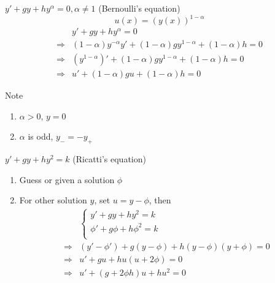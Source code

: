 \documentclass{beamer}
\begin{document}
\begin{frame}
\begin{block}{$y'+gy+hy^{\alpha}=0,\alpha\neq1$ (Bernoulli's equation)}
$$u(x)=(y(x))^{1-\alpha}$$
\begin{align*}
&y'+gy+hy^\alpha=0\\
\Rightarrow& (1-\alpha)y^{-\alpha}y'+(1-\alpha)gy^{1-\alpha}+(1-\alpha)h=0\\
\Rightarrow& (y^{1-\alpha})'+(1-\alpha)gy^{1-\alpha}+(1-\alpha)h=0\\
\Rightarrow& u'+(1-\alpha)gu+(1-\alpha)h=0
\end{align*}
\begin{block}{Note}
\begin{enumerate}
\item $\alpha>0$, $y=0$
\item $\alpha$ is odd, $y_-=-y_+$
\end{enumerate}
\end{block}
\end{block}
\end{frame}

\begin{frame}
\begin{block}{$y'+gy+hy^2=k$ (Ricatti's equation)}
\begin{enumerate}
\item Guess or given a solution $\phi$
\item For other solution $y$, set $u=y-\phi$, then
\begin{align*}
&\left\{
\begin{aligned}
y'+gy+hy^2=k\\
\phi'+g\phi+h\phi^2=k\\
\end{aligned}
\right.\\\Rightarrow & (y'-\phi')+g(y-\phi)+h(y-\phi)(y+\phi)=0\\
\Rightarrow&u'+gu+hu(u+2\phi)=0\\
\Rightarrow&u'+(g+2\phi h)u+hu^2=0
\end{align*}
\end{enumerate}
\end{block}
\end{frame}
\end{document}
